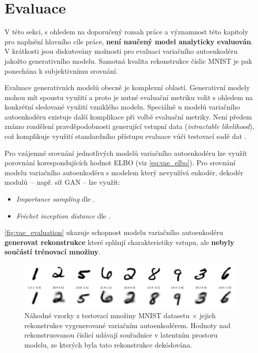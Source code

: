 \section{Evaluace}
V této sekci, s ohledem na doporučený rozsah práce a významnost této kapitoly pro naplnění hlavního cíle práce, \textbf{není naučený model analyticky evaluován}.
V krátkosti jsou diskutovány možnosti pro evaluaci variačního autoenkodéru jakožto generativního modelu.
Samotná kvalita rekonstrukce číslic MNIST je pak ponechána k subjektivnímu srovnání.

Evaluace generativních modelů obecně je komplexní oblastí.
Generativní modely mohou mít spoustu využití a proto je nutné evaluační metriku volit s ohledem na konkrétní sledované využití vzniklého modelu.
Speciálně u modelů variačního autoenkodéru existuje další komplikace při volbě evaluační metriky. Není předem známo rozdělení pravděpodobnosti generující vstupní data (\emph{intractable likelihood}), což komplikuje využití standardního přístupu evaluace vůči testovací sadě dat \cite{Goodfellow2016}.

Pro vzájemné srovnání jednotlivých modelů variačního autoenkodéru lze využít porovnání korespondujících hodnot ELBO (viz \autoref{eq:vae_elbo}).
Pro srovnání modelu variačního autoenkodéru s modelem který nevyužívá enkodér, dekodér modulů – např. síť GAN \cite{Goodfellow2014} – lze využít:

\begin{itemize}
    \item \emph{Importance sampling} dle \textcite{Bartler2019}.
    \item \emph{Fréchet inception distance} dle \textcite{Asperti2020}.
\end{itemize}

\autoref{fig:vae_evaluation} ukazuje schopnost modelu variačního autoenkodéru \textbf{generovat rekonstrukce} které splňují charakteristiky vstupu, ale \textbf{nebyly součástí trénovací množiny}.

\begin{figure}[H]
    \centering
    \includegraphics[width=\textwidth]{figures/vae_model_reconstructions.png}
    \caption{Náhodné vzorky z testovací množiny MNIST datasetu $\times$ jejich rekonstrukce vygenerované variačním autoenkodérem. Hodnoty nad rekonstruovanou číslicí udávají souřadnice v latentním prostoru modelu, ze kterých byla tato rekonstrukce dekódována.}
    \label{fig:vae_evaluation}
\end{figure}

